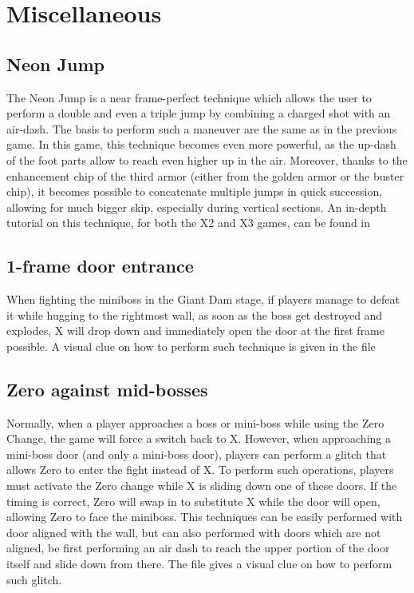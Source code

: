 \section{Miscellaneous}\label{X3:misc} %
\subsection{Neon Jump}\label{x3-neon}
The Neon Jump is a near frame-perfect technique which allows the user to perform a double and even a triple jump by combining a charged shot with an air-dash. The basis to perform such a maneuver are the same as in the previous game. In this game, this technique becomes even more powerful, as the up-dash of the foot parts allow to reach even higher up in the air. Moreover, thanks to the enhancement chip of the third armor (either from the golden armor or the buster chip), it becomes possible to concatenate multiple jumps in quick succession, allowing for much bigger skip, especially during vertical sections.
An in-depth tutorial on this technique, for both the X2 and X3 games, can be found in \cite{video:Neon}

\subsection{1-frame door entrance}
When fighting the miniboss in the Giant Dam stage, if players manage to defeat it while hugging to the rightmost wall, as soon as the boss get destroyed and explodes, X will drop down and immediately open the door at the first frame possible. A visual clue on how to perform such technique is given in the file 

\subsection{Zero against mid-bosses}
Normally, when a player approaches a boss or mini-boss while using the Zero Change, the game will force a switch back to X. However, when approaching a mini-boss door (and only a mini-boss door), players can perform a glitch that allows Zero to enter the fight instead of X. To perform such operations, players must activate the Zero change while X is sliding down one of these doors. If the timing is correct, Zero will swap in to substitute X while the door will open, allowing Zero to face the miniboss. This techniques can be easily performed with door aligned with the wall, but can also performed with doors which are not aligned, be first performing an air dash to reach the upper portion of the door itself and slide down from there. The file  gives a visual clue on how to perform such glitch.

